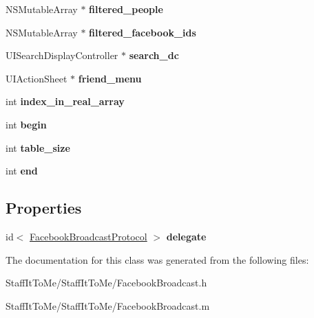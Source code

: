 \begin{DoxyCompactItemize}
\item 
\hypertarget{interface_facebook_broadcast_acaf06dbbc3bdd1d16e56daa13498741c}{
\-N\-S\-Mutable\-Array $\ast$ {\bfseries filtered\-\_\-people}}
\label{interface_facebook_broadcast_acaf06dbbc3bdd1d16e56daa13498741c}

\item 
\hypertarget{interface_facebook_broadcast_a5b639b9e63b124bbac02f21f4ec59cd9}{
\-N\-S\-Mutable\-Array $\ast$ {\bfseries filtered\-\_\-facebook\-\_\-ids}}
\label{interface_facebook_broadcast_a5b639b9e63b124bbac02f21f4ec59cd9}

\item 
\hypertarget{interface_facebook_broadcast_a5f8211a8fb10ae2ec8458be7fb8028c6}{
\-U\-I\-Search\-Display\-Controller $\ast$ {\bfseries search\-\_\-dc}}
\label{interface_facebook_broadcast_a5f8211a8fb10ae2ec8458be7fb8028c6}

\item 
\hypertarget{interface_facebook_broadcast_ae246753439b38ce686ebab6d90a7398a}{
\-U\-I\-Action\-Sheet $\ast$ {\bfseries friend\-\_\-menu}}
\label{interface_facebook_broadcast_ae246753439b38ce686ebab6d90a7398a}

\item 
\hypertarget{interface_facebook_broadcast_ad797f4531102aae55847d65981d52066}{
int {\bfseries index\-\_\-in\-\_\-real\-\_\-array}}
\label{interface_facebook_broadcast_ad797f4531102aae55847d65981d52066}

\item 
\hypertarget{interface_facebook_broadcast_a16ac25d64165b906b93fbe9eb8794452}{
int {\bfseries begin}}
\label{interface_facebook_broadcast_a16ac25d64165b906b93fbe9eb8794452}

\item 
\hypertarget{interface_facebook_broadcast_ad9df4d5e604ceb9821fdd17b815b98b7}{
int {\bfseries table\-\_\-size}}
\label{interface_facebook_broadcast_ad9df4d5e604ceb9821fdd17b815b98b7}

\item 
\hypertarget{interface_facebook_broadcast_aeaec70b989b61757a215aea6bed16f06}{
int {\bfseries end}}
\label{interface_facebook_broadcast_aeaec70b989b61757a215aea6bed16f06}

\end{DoxyCompactItemize}
\subsection*{\-Properties}
\begin{DoxyCompactItemize}
\item 
\hypertarget{interface_facebook_broadcast_a328f8c1864b72a405c6aaf879524ab34}{
id$<$ \hyperlink{protocol_facebook_broadcast_protocol-p}{\-Facebook\-Broadcast\-Protocol} $>$ {\bfseries delegate}}
\label{interface_facebook_broadcast_a328f8c1864b72a405c6aaf879524ab34}

\end{DoxyCompactItemize}


\-The documentation for this class was generated from the following files\-:\begin{DoxyCompactItemize}
\item 
\-Staff\-It\-To\-Me/\-Staff\-It\-To\-Me/\-Facebook\-Broadcast.\-h\item 
\-Staff\-It\-To\-Me/\-Staff\-It\-To\-Me/\-Facebook\-Broadcast.\-m\end{DoxyCompactItemize}
